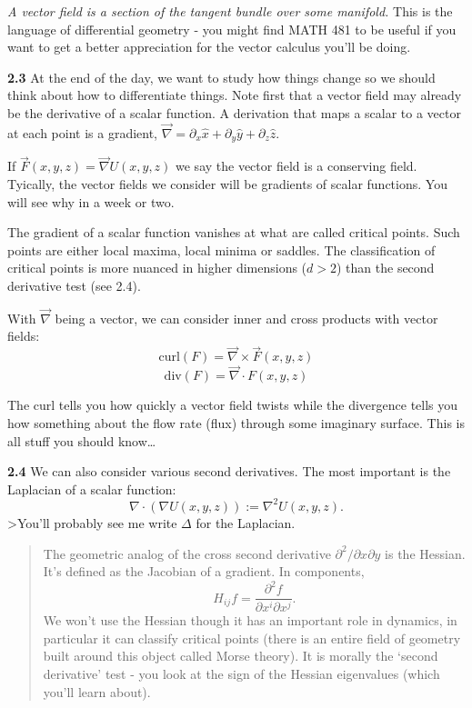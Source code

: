 \documentclass[11pt]{article}
\begin{document}
\begin{tcolorbox}[title=Some fancy geometry words]
\emph{A vector field is a
section of the tangent bundle over some manifold.} This is the
language of differential geometry - you might find MATH 481 to be useful
if you want to get a better appreciation for the vector calculus you'll
be doing. 
\end{tcolorbox}

\textbf{2.3} At the end of the day, we want to study how things change
so we should think about how to differentiate things. Note first that a
vector field may already be the derivative of a scalar function. A
derivation that maps a scalar to a vector at each point is a gradient,
\(\vec \nabla=\partial_x \hat x+\partial_y\hat y+\partial_z\hat z\).

If \(\vec F(x,y,z) =\vec \nabla U(x,y,z)\) we say the vector field is a
conserving field. Tyically, the vector fields we consider will be
gradients of scalar functions. You will see why in a week or two.

The gradient of a scalar function vanishes at what are called critical
points. Such points are either local maxima, local minima or saddles.
The classification of critical points is more nuanced in higher
dimensions (\(d>2\)) than the second derivative test (see 2.4).

With $\vec \nabla $ being a vector, we can consider inner and cross
products with vector fields: \[
\text{curl}(F) = \vec\nabla\times \vec F(x,y,z)
\]
$$
\text{div}(F) = \vec\nabla \cdot F(x,y,z)
$$

The curl tells you how quickly a vector field twists while the
divergence tells you how something about the flow rate (flux) through
some imaginary surface. This is all stuff you should know\ldots{}

\textbf{2.4} We can also consider various second derivatives. The most
important is the Laplacian of a scalar function: \[
\nabla\cdot(\nabla U(x,y,z)):=\nabla^2U(x,y,z).
\] \textgreater You'll probably see me write \(\Delta\) for the
Laplacian.

\begin{quote}
The geometric analog of the cross second derivative
\(\partial^2/\partial x\partial y\) is the Hessian. It's defined as the
Jacobian of a gradient. In components, \[
H_{ij}f=\frac{\partial^2 f}{\partial x^i\partial x^j}.
\] We won't use the Hessian though it has an important role in dynamics,
in particular it can classify critical points (there is an entire field
of geometry built around this object called Morse theory). It is morally
the `second derivative' test - you look at the sign of the Hessian
eigenvalues (which you'll learn about).
\end{quote}
\end{document}
